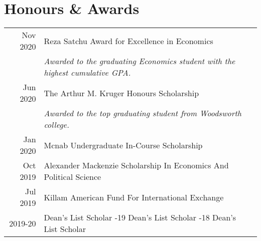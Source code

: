 \documentclass[letterpaper]{deedy-resume} %
\begin{document}
\begin{minipage}[t]{0.66\textwidth}
%
%



\section{Honours \& Awards} 

\begin{tabular}{rll}
Nov 2020	 & Reza Satchu Award for Excellence in Economics \\
			 & \emph{Awarded to the graduating Economics student with the highest cumulative GPA.} \\
Jun 2020	 & The Arthur M. Kruger Honours Scholarship \\
			 & \emph{Awarded to the top graduating student from Woodsworth college.}
\\
Jan 2020	 & Mcnab Undergraduate In-Course Scholarship \\
Oct 2019	 & Alexander Mackenzie Scholarship In Economics And Political Science\\
Jul 2019	 & Killam American Fund For International Exchange \\
2019-20		 & Dean's List Scholar \quad 
2018-19		  Dean's List Scholar \quad
2017-18		  Dean's List Scholar
\end{tabular}

\sectionspace %


%



\end{minipage} %
\end{document}
